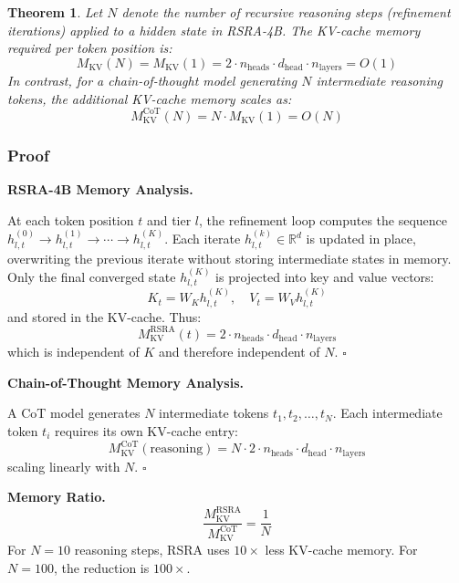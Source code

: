 \documentclass[11pt,a4paper]{article}
\newtheorem{theorem}{Theorem}
\theoremstyle{definition}
\begin{document}
\begin{theorem}
Let $N$ denote the number of recursive reasoning steps (refinement iterations) applied to a hidden state in RSRA-4B. The KV-cache memory required per token position is:
\[ M_{\mathrm{KV}}(N) = M_{\mathrm{KV}}(1) = 2 \cdot n_{\mathrm{heads}} \cdot d_{\mathrm{head}} \cdot n_{\mathrm{layers}} = O(1) \]
In contrast, for a chain-of-thought model generating $N$ intermediate reasoning tokens, the additional KV-cache memory scales as:
\[ M_{\mathrm{KV}}^{\mathrm{CoT}}(N) = N \cdot M_{\mathrm{KV}}(1) = O(N) \]
\end{theorem}

\subsubsection{Proof}

\noindent\textbf{RSRA-4B Memory Analysis.}

\noindent At each token position $t$ and tier $l$, the refinement loop computes the sequence $h_{l,t}^{(0)} \to h_{l,t}^{(1)} \to \cdots \to h_{l,t}^{(K)}$. Each iterate $h_{l,t}^{(k)} \in \mathbb{R}^d$ is updated in place, overwriting the previous iterate without storing intermediate states in memory. Only the final converged state $h_{l,t}^{(K)}$ is projected into key and value vectors:
\[ K_t = W_K h_{l,t}^{(K)}, \quad V_t = W_V h_{l,t}^{(K)} \]
and stored in the KV-cache. Thus:
\[ M_{\mathrm{KV}}^{\mathrm{RSRA}}(t) = 2 \cdot n_{\mathrm{heads}} \cdot d_{\mathrm{head}} \cdot n_{\mathrm{layers}} \]
which is independent of $K$ and therefore independent of $N$. \hfill$\square$

\vspace{0.5em}
\noindent\textbf{Chain-of-Thought Memory Analysis.}

\noindent A CoT model generates $N$ intermediate tokens $t_1, t_2, \ldots, t_N$. Each intermediate token $t_i$ requires its own KV-cache entry:
\[ M_{\mathrm{KV}}^{\mathrm{CoT}}(\text{reasoning}) = N \cdot 2 \cdot n_{\mathrm{heads}} \cdot d_{\mathrm{head}} \cdot n_{\mathrm{layers}} \]
scaling linearly with $N$. \hfill$\square$

\vspace{0.5em}
\noindent\textbf{Memory Ratio.}
\[ \frac{M_{\mathrm{KV}}^{\mathrm{RSRA}}}{M_{\mathrm{KV}}^{\mathrm{CoT}}} = \frac{1}{N} \]
For $N = 10$ reasoning steps, RSRA uses $10\times$ less KV-cache memory. For $N = 100$, the reduction is $100\times$.
\end{document}
